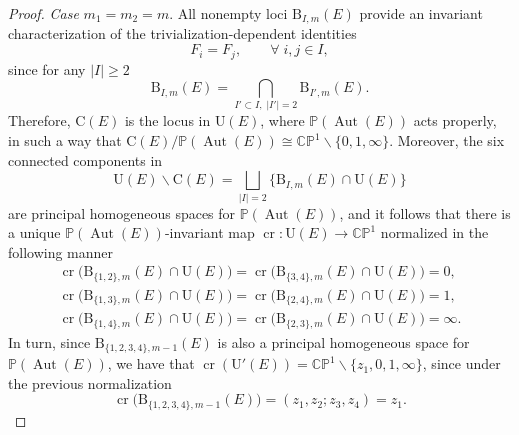 \documentclass[10pt,a4paper]{amsart}
\newcommand{\field}[1]{\ensuremath{\mathbb{#1}}}
\newcommand{\CC}{\field{C}}
\newcommand{\PP}{\field{P}}
\DeclareMathOperator{\Aut}{Aut}
\numberwithin{equation}{section}
\begin{document}
\begin{proof}
\noindent \textit{Case} $m_{1} = m_{2} = m$. All nonempty loci $\mathrm{B}_{I,m}(E)$ provide an invariant characterization of the trivialization-dependent identities
\[
F_{i}=F_{j},\qquad \forall\; i,j\in I,
\]
since for any $\vert I \vert \geq 2$
\[
\mathrm{B}_{I,m}(E) = \bigcap_{I'\subset I,\; \vert I'\vert =2} \mathrm{B}_{I',m}(E).
\]
Therefore, $\mathrm{C}(E)$ is the locus in $\mathrm{U}(E)$, where $\PP(\Aut(E))$ acts properly, in such a way that $\mathrm{C}(E)/\PP(\Aut(E))\cong \CC\PP^{1}\backslash\{0,1,\infty\}$. Moreover, the six connected components in
\[
\mathrm{U}(E)\backslash\mathrm{C}(E) = \bigsqcup_{\vert I\vert =2} \bigl\{\mathrm{B}_{I,m}(E)\cap\mathrm{U}(E)\bigr\}
\]
are principal homogeneous spaces for $\PP(\Aut(E))$, and it follows that there is a unique $\PP(\Aut(E))$-invariant map $\operatorname{cr}\colon \mathrm{U}(E)\rightarrow \CC\PP^{1}$ normalized in the following manner
\begin{gather*}
\operatorname{cr}\bigl(\mathrm{B}_{\{1,2\},m}(E)\cap\mathrm{U}(E)\bigr) = \operatorname{cr}\bigl(\mathrm{B}_{\{3,4\},m}(E)\cap\mathrm{U}(E)\bigr) = 0,
\\
\operatorname{cr}\bigl(\mathrm{B}_{\{1,3\},m}(E)\cap\mathrm{U}(E)\bigr) = \operatorname{cr}\bigl(\mathrm{B}_{\{2,4\},m}(E)\cap\mathrm{U}(E)\bigr) = 1,
\\
\operatorname{cr}\bigl(\mathrm{B}_{\{1,4\},m}(E)\cap\mathrm{U}(E)\bigr) = \operatorname{cr}\bigl(\mathrm{B}_{\{2,3\},m}(E)\cap\mathrm{U}(E)\bigr) = \infty.
\end{gather*}
In turn, since $ \mathrm{B}_{\{1,2,3,4\},m-1}(E)$ is also a principal homogeneous space for $\PP(\Aut(E))$, we have that $\operatorname{cr}(\mathrm{U}'(E)) = \CC\PP^{1}\backslash\{z_{1},0,1,\infty\}$, since under the previous
normalization
\[
\operatorname{cr}\bigl(\mathrm{B}_{\{1,2,3,4\},m-1}(E)\bigr) = (z_{1},z_{2};z_{3},z_{4}) =z_{1}.
\]


\end{proof}
\end{document}
